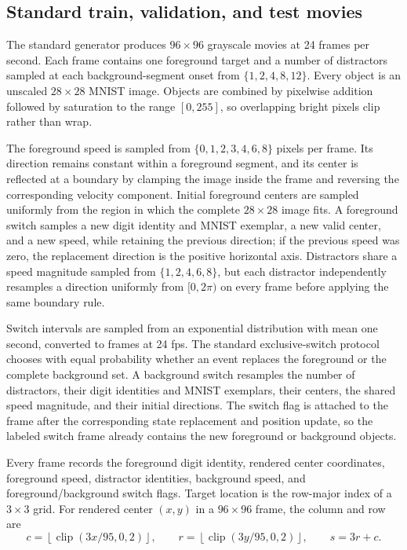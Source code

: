 \subsection{Standard train, validation, and test movies}

The standard generator produces \(96\times96\) grayscale movies at 24 frames per second. Each frame contains one foreground target and a number of distractors sampled at each background-segment onset from \(\{1,2,4,8,12\}\). Every object is an unscaled \(28\times28\) MNIST image. Objects are combined by pixelwise addition followed by saturation to the range \([0,255]\), so overlapping bright pixels clip rather than wrap.

The foreground speed is sampled from \(\{0,1,2,3,4,6,8\}\) pixels per frame. Its direction remains constant within a foreground segment, and its center is reflected at a boundary by clamping the image inside the frame and reversing the corresponding velocity component. Initial foreground centers are sampled uniformly from the region in which the complete \(28\times28\) image fits. A foreground switch samples a new digit identity and MNIST exemplar, a new valid center, and a new speed, while retaining the previous direction; if the previous speed was zero, the replacement direction is the positive horizontal axis. Distractors share a speed magnitude sampled from \(\{1,2,4,6,8\}\), but each distractor independently resamples a direction uniformly from \([0,2\pi)\) on every frame before applying the same boundary rule.

Switch intervals are sampled from an exponential distribution with mean one second, converted to frames at 24 fps. The standard exclusive-switch protocol chooses with equal probability whether an event replaces the foreground or the complete background set. A background switch resamples the number of distractors, their digit identities and MNIST exemplars, their centers, the shared speed magnitude, and their initial directions. The switch flag is attached to the frame after the corresponding state replacement and position update, so the labeled switch frame already contains the new foreground or background objects.

Every frame records the foreground digit identity, rendered center coordinates, foreground speed, distractor identities, background speed, and foreground/background switch flags. Target location is the row-major index of a \(3\times3\) grid. For rendered center \((x,y)\) in a \(96\times96\) frame, the column and row are
\[
c=\left\lfloor\operatorname{clip}\!\left(3x/95,0,2\right)\right\rfloor,
\qquad
r=\left\lfloor\operatorname{clip}\!\left(3y/95,0,2\right)\right\rfloor,
\qquad
s=3r+c.
\]

